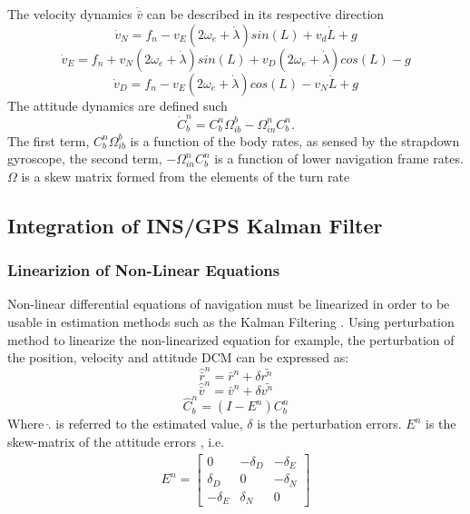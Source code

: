 The velocity dynamics $\dot{\bar{v}}$ can be described in its respective direction \cite{non-linear}
\begin{equation}
\dot{v}_N = f_n-v_E(2\omega_e+\dot{\lambda})sin(L) + v_d\dot{L}+g
\label{Eq.v_n}
\end{equation}
\begin{equation}
\dot{v}_E = f_n+v_N(2\omega_e+\dot{\lambda})sin(L) + v_D(2\omega_e+\dot{\lambda})cos(L)-g
\label{Eq.v_e}
\end{equation}
\begin{equation}
\dot{v}_D = f_n-v_E(2\omega_e+\dot{\lambda})cos(L) - v_N\dot{L}+g
\end{equation}
The attitude dynamics are defined such \cite{non-linear}
\begin{equation}
\dot{C}_b^n = C_b^n\Omega_{ib}^b-\Omega_{in}^nC_b^n.
\end{equation}
The first term, $C_b^n\Omega_{ib}^b$ is a function of the body rates, as sensed by the strapdown gyroscope, the second term, $-\Omega_{in}^nC_b^n$ is a function of lower navigation frame rates. $\Omega$ is a skew matrix formed from the elements of the turn rate



\subsection*{Integration of INS/GPS Kalman Filter}
\subsubsection*{Linearizion of Non-Linear Equations}
Non-linear differential equations of navigation must be linearized in order to be usable in estimation methods such as the Kalman Filtering \cite{non-linear}. Using perturbation method to linearize the non-linearized equation for example, the perturbation of the position, velocity and attitude DCM can be expressed as:
\begin{equation}
\hat{\bar{r}}^n = \bar{r}^n + \delta\bar{r^n}
\label{Eq.pos}
\end{equation}
\begin{equation}
\hat{\bar{v}}^n = \bar{v}^n + \delta\bar{v^n}
\label{Eq.vel}
\end{equation}
\begin{equation}
\hat{C}_b^n  = (I-E^n)C_b^n
\label{eq:atti}
\end{equation}
Where $\hat{.}$ is referred to the estimated value, $\delta$ is the perturbation errors. $E^n$ is the skew-matrix of the attitude errors \cite{non-linear}, i.e.
\begin{align}
E^n=
\begin{bmatrix}
0 & -\delta_D & -\delta_E\\
\delta_D & 0 & -\delta_N \\
-\delta_E & \delta_N & 0
\end{bmatrix}
\end{align}

